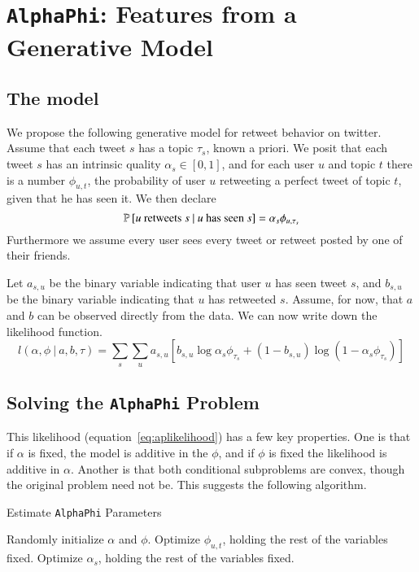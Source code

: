 \section{\texttt{AlphaPhi}: Features from a Generative Model}

\subsection{The model}
We propose the following generative model for retweet behavior on twitter.
Assume that each tweet $s$ has a topic $\tau_s$, known a priori.
We posit that each tweet $s$ has an intrinsic quality $\alpha_s\in [0,1]$, and for each user $u$  and topic $t$ there is a number $\phi_{u,t}$, the probability of user $u$ retweeting a perfect tweet of topic $t$, given that he has seen it.
We then declare
\begin{equation}\label{eq:apeq}
\mathbb{P} \left[\mbox{$u$ retweets $s$}~|~\mbox{$u$ has seen $s$}\right] = \alpha_s\phi_{u,\tau_s}
\end{equation}
Furthermore we assume every user sees every tweet or retweet posted by one of their friends.

Let $a_{s,u}$ be the binary variable indicating that user $u$ has seen tweet $s$, and $b_{s,u}$ be the binary variable indicating that $u$ has retweeted $s$.
Assume, for now, that $a$ and $b$ can be observed directly from the data.
We can now write down the likelihood function.
\begin{equation} \label{eq:aplikelihood}
l(\alpha,\phi~|~a,b,\tau) = \sum_s\sum_u a_{s,u} \left[b_{s,u}\log\alpha_s\phi_{\tau_s} + (1-b_{s,u})\log(1-\alpha_s\phi_{\tau_s})\right]
\end{equation}


\subsection{Solving the \texttt{AlphaPhi} Problem}

This likelihood (equation~\eqref{eq:aplikelihood}) has a few key properties.  
One is that if $\alpha$ is fixed, the model is additive in the $\phi$, and if $\phi$ is fixed the likelihood is additive in $\alpha$.  
Another is that both conditional subproblems are convex, though the original problem need not be.  
This suggests the following algorithm.  
\begin{algorithm}
  \caption{Estimate \texttt{AlphaPhi} Parameters}
  \label{alg:apalg}

  \begin{algorithmic}
    \State Randomly initialize $\alpha$ and $\phi$.
    \State Optimize $\phi_{u,t}$, holding the rest of the variables fixed.  
    \EndFor
    \State Optimize $\alpha_s$, holding the rest of the variables fixed.  
    \EndFor
    \EndWhile
    \EndFor
  \end{algorithmic}
\end{algorithm}
  
